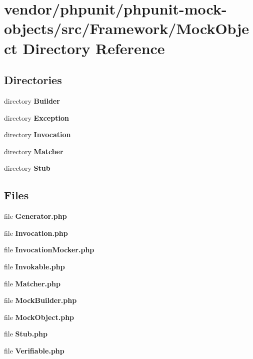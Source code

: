 \section{vendor/phpunit/phpunit-\/mock-\/objects/src/\+Framework/\+Mock\+Object Directory Reference}
\label{dir_0fd57e6be14d03b8c110efcb40f24539}
\subsection*{Directories}
\begin{DoxyCompactItemize}
\item 
directory {\bf Builder}
\item 
directory {\bf Exception}
\item 
directory {\bf Invocation}
\item 
directory {\bf Matcher}
\item 
directory {\bf Stub}
\end{DoxyCompactItemize}
\subsection*{Files}
\begin{DoxyCompactItemize}
\item 
file {\bf Generator.\+php}
\item 
file {\bf Invocation.\+php}
\item 
file {\bf Invocation\+Mocker.\+php}
\item 
file {\bf Invokable.\+php}
\item 
file {\bf Matcher.\+php}
\item 
file {\bf Mock\+Builder.\+php}
\item 
file {\bf Mock\+Object.\+php}
\item 
file {\bf Stub.\+php}
\item 
file {\bf Verifiable.\+php}
\end{DoxyCompactItemize}

